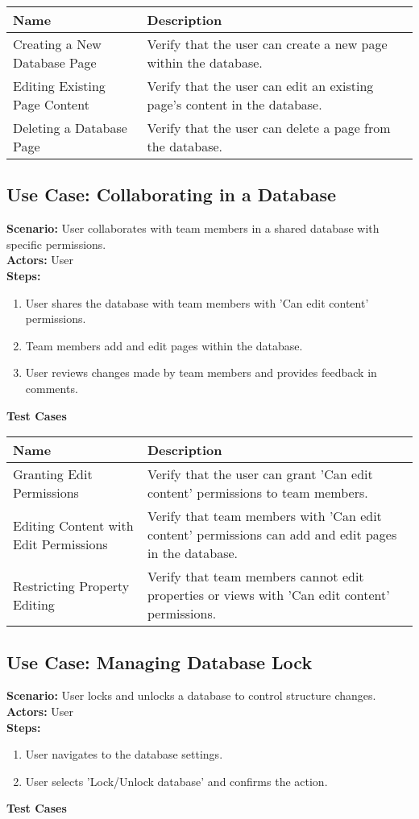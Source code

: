 \documentclass{article}
\begin{document}
            \begin{longtable}{|p{}|p{}|}
            \hline
            \textbf{Name} & \textbf{Description} \\
            \hline
            Creating a New Database Page & Verify that the user can create a new page within the database. \\
\hline
Editing Existing Page Content & Verify that the user can edit an existing page's content in the database. \\
\hline
Deleting a Database Page & Verify that the user can delete a page from the database. \\
\hline
\end{longtable}\subsection{\textbf{Use Case: Collaborating in a Database}}
\textbf{Scenario:} User collaborates with team members in a shared database with specific permissions.\\
\textbf{Actors:} User\\
\textbf{Steps:}
\begin{enumerate}
\item User shares the database with team members with 'Can edit content' permissions.
\item Team members add and edit pages within the database.
\item User reviews changes made by team members and provides feedback in comments.
\end{enumerate}
\textbf{Test Cases}

            \begin{longtable}{|p{}|p{}|}
            \hline
            \textbf{Name} & \textbf{Description} \\
            \hline
            Granting Edit Permissions & Verify that the user can grant 'Can edit content' permissions to team members. \\
\hline
Editing Content with Edit Permissions & Verify that team members with 'Can edit content' permissions can add and edit pages in the database. \\
\hline
Restricting Property Editing & Verify that team members cannot edit properties or views with 'Can edit content' permissions. \\
\hline
\end{longtable}\subsection{\textbf{Use Case: Managing Database Lock}}
\textbf{Scenario:} User locks and unlocks a database to control structure changes.\\
\textbf{Actors:} User\\
\textbf{Steps:}
\begin{enumerate}
\item User navigates to the database settings.
\item User selects 'Lock/Unlock database' and confirms the action.
\end{enumerate}
\textbf{Test Cases}
\end{document}

